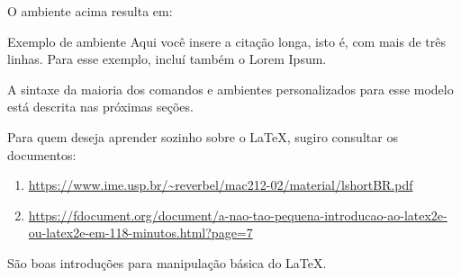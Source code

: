O ambiente acima resulta em:

\begin{citel}{Exemplo de ambiente}
	Aqui você insere a citação longa, isto é, com mais de três linhas. Para esse exemplo, incluí também o Lorem Ipsum. \lipsum[1]
\end{citel}

A sintaxe da maioria dos comandos e ambientes personalizados para esse modelo está descrita nas próximas seções.

Para quem deseja aprender sozinho sobre o \LaTeX, sugiro consultar os documentos:

\begin{enumerate}
	\item \url{https://www.ime.usp.br/~reverbel/mac212-02/material/lshortBR.pdf}
	\item \url{https://fdocument.org/document/a-nao-tao-pequena-introducao-ao-latex2e-ou-latex2e-em-118-minutos.html?page=7}
\end{enumerate}

São boas introduções para manipulação básica do \LaTeX.